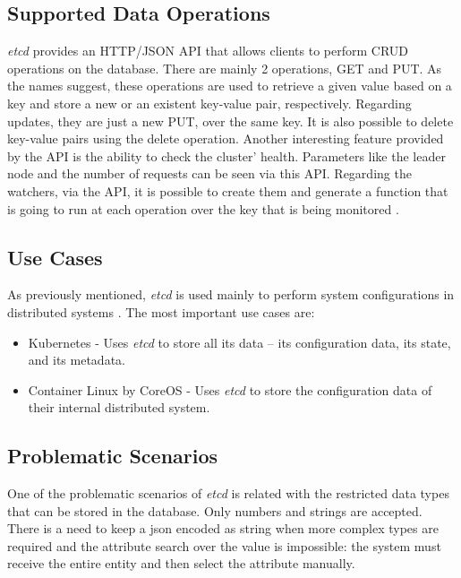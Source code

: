 \documentclass[screen,review]{acmart}
\begin{document}
\subsection{Supported Data Operations}
\textit{etcd} provides an HTTP/JSON API \cite{etcd_api} that allows clients to perform CRUD operations \cite{crud} on the database.
There are mainly 2 operations, GET and PUT. As the names suggest, these operations are used to retrieve a given value based on a key and store a new or an existent key-value pair, respectively. 
Regarding updates, they are just a new PUT, over the same key.
It is also possible to delete key-value pairs using the delete operation.
Another interesting feature provided by the API is the ability to check the cluster' health. Parameters like the leader node and the number of requests can be seen via this API.
Regarding the watchers, via the API, it is possible to create them and generate a function that is going to run at each operation over the key that is being monitored \cite{etcd_api}.

\subsection{Use Cases}
As previously mentioned, \textit{etcd} is used mainly to perform system configurations in distributed systems \cite{etcd_why}.
The most important use cases are:

\begin{itemize}
    \item Kubernetes \cite{kubernetes} - Uses \textit{etcd} to store all its data – its configuration data, its state, and its metadata. 
    \item Container Linux by CoreOS \cite{coreos} - Uses \textit{etcd} to store the configuration data of their internal distributed system.
\end{itemize}

\subsection{Problematic Scenarios}

One of the problematic scenarios of \textit{etcd} is related with the restricted data types that can be stored in the database. Only numbers and strings are accepted. There is a need to keep a json encoded as string when more complex types are required and the attribute search over the value is impossible: the system must receive the entire entity and then select the attribute manually.
\end{document}
